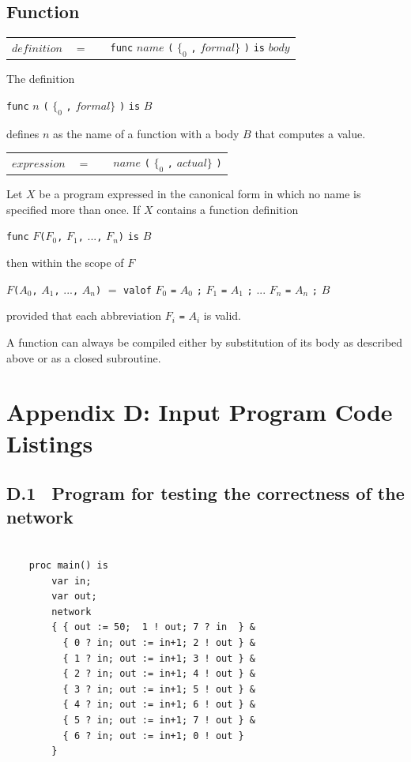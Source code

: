 \documentclass[a4paper, 12pt]{article}
\begin{document}
\subsection*{Function}

\begin{tabular}{llll}
$definition$    & $=$ && \verb|func| $name$ \verb|(| $\{_0$ \verb:,: $formal \}$ \verb|)| \verb|is| $body$\\
\end{tabular}   

The definition 

\verb|func| $n$ \verb|(| $\{_0$ \verb:,: $formal \}$ \verb|)| \verb|is| $B$

defines $n$ as the name of a function with a body $B$ that computes a value.

\begin{tabular}{llll}
$expression$    & $=$ &&$name$ \verb|(| $\{_0$ \verb:,: $actual \}$ \verb|)| 
\end{tabular}   

Let $X$ be a program expressed in the canonical form in which no name is specified more than once. If $X$
contains a function definition 

\verb|func| $F$\verb|(|$F_0$\verb|,| $F_1$\verb|,| ...\verb|,| $F_n$\verb|)| \verb|is| $B$

then within the scope of $F$

$F$\verb|(|$A_0$\verb|,| $A_1$\verb|,| ...\verb|,| $A_n$\verb|)| $=$ \verb|valof| $F_0$ \verb|=| $A_0$ \verb|;| $F_1$ \verb|=| $A_1$ \verb|;| ... $F_n$ \verb|=| $A_n$ \verb|;| $B$

provided that each abbreviation $F_i$ \verb|=| $A_i$ is valid. 

A function can always be compiled either by substitution of its body as described above or as a closed
subroutine.

\newpage
\section*{Appendix D: Input Program Code Listings}

\subsection*{D.1 \ Program for testing the correctness of the network}

\begin{lstlisting}

    proc main() is
        var in;
        var out;
        network 
        { { out := 50;  1 ! out; 7 ? in  } &
          { 0 ? in; out := in+1; 2 ! out } &
          { 1 ? in; out := in+1; 3 ! out } &
          { 2 ? in; out := in+1; 4 ! out } &
          { 3 ? in; out := in+1; 5 ! out } &
          { 4 ? in; out := in+1; 6 ! out } &
          { 5 ? in; out := in+1; 7 ! out } &
          { 6 ? in; out := in+1; 0 ! out } 
        }

\end{lstlisting}
\end{document}
